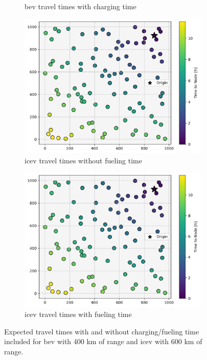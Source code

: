 \begin{figure}[H]
\begin{subfigure}[t]{.5\linewidth}
		\captionsetup{width=.8\linewidth}
		\caption{\gls{bev} travel times with charging time}
	\end{subfigure}
	\begin{subfigure}[t]{.5\linewidth}
		\centering\includegraphics[width = \linewidth]{figs/effect_of_charging_icev_nc.png}
		\captionsetup{width=.8\linewidth}
		\caption{\gls{icev} travel times without fueling time}
	\end{subfigure}%
	\begin{subfigure}[t]{.5\linewidth}
		\centering\includegraphics[width = \linewidth]{figs/effect_of_charging_icev_c.png}
		\captionsetup{width=.8\linewidth}
		\caption{\gls{icev} travel times with fueling time}
	\end{subfigure}
	\caption{Expected travel times with and without charging/fueling time included for \gls{bev} with 400 km of range and \gls{icev} with 600 km of range.}
	\label{fig:effect_of_charging}
\end{figure}

